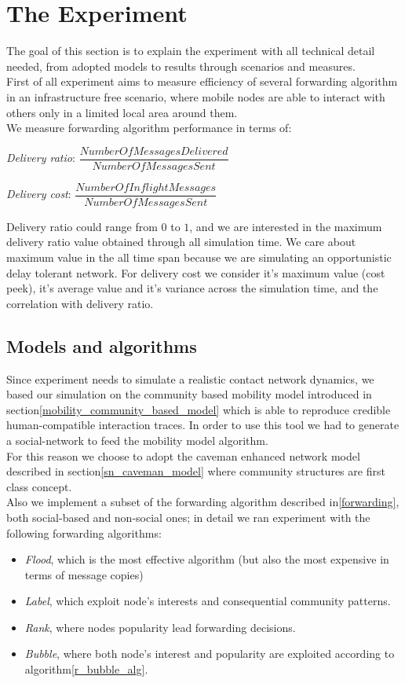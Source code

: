 \newpage
\section{The Experiment}
\label{experiment}

The goal of this section is to explain the experiment with all technical detail needed, from adopted models to results through scenarios and measures.\\
First of all experiment aims to measure efficiency of several forwarding algorithm in an infrastructure free scenario, where mobile nodes are able to interact with others only in a limited local area around them. \\
We measure forwarding algorithm performance in terms of:
\begin{list}{}
\item \emph{Delivery ratio}: $ \dfrac{Number Of Messages Delivered}{ Number Of Messages Sent } $ 
\item \emph{Delivery cost}:  $ \dfrac{Number Of Inflight Messages }{ Number Of Messages Sent } $
\end{list}
Delivery ratio could range from $0$ to $1$, and we are interested in the maximum delivery ratio value obtained through all simulation time. We care about maximum value in the all time span because we are simulating an opportunistic delay tolerant network. For delivery cost we consider it's maximum value (cost peek), it's average value and it's variance across the simulation time, and the correlation with delivery ratio.\\ 

\subsection{Models and algorithms}
\label{exp_incarnation}
Since experiment needs to simulate a realistic contact network dynamics, we based our simulation on the community based mobility model introduced in section\ref{mobility_community_based_model} which is able to reproduce credible human-compatible interaction traces. In order to use this tool we had to generate a social-network to feed the mobility model algorithm.\\
For this reason we choose to adopt the caveman enhanced network model described in section\ref{sn_caveman_model} where community structures are first class concept.\\
Also we implement a subset of the forwarding algorithm described in\ref{forwarding}, both social-based and non-social ones; in detail we ran experiment with the following forwarding algorithms:
\begin{itemize}
\item \emph{Flood}, which is the most effective algorithm (but also the most expensive in terms of message copies)
\item \emph{Label}, which exploit node's interests and consequential community patterns.
\item \emph{Rank}, where nodes popularity lead forwarding decisions.
\item \emph{Bubble}, where both node's interest and popularity are exploited according to algorithm\ref{r_bubble_alg}.
\end{itemize}

